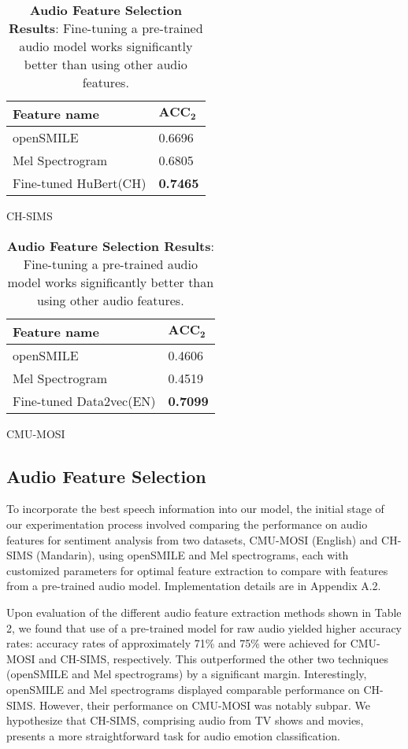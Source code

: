 \documentclass[11pt]{article}
\begin{document}
\begin{table}
\begin{subtable}{0.15\textwidth}
\begin{tabular}{ll}
\hline
\textbf{Feature name} & $\mathbf{ACC_2}$ \\ \hline
openSMILE             & 0.6696               \\ 
Mel Spectrogram       & 0.6805               \\ 
Fine-tuned HuBert(CH) & \textbf{0.7465}       \\ \hline
\end{tabular}
\caption{CH-SIMS}
\label{tab:dataset2}
\end{subtable}

\vspace{0.3cm}

\begin{subtable}{0.15\textwidth}
\begin{tabular}{ll}
\hline
\textbf{Feature name} & $\mathbf{ACC_2}$ \\ \hline
openSMILE             & 0.4606               \\ 
Mel Spectrogram       & 0.4519               \\ 
Fine-tuned Data2vec(EN) & \textbf{0.7099}     \\ \hline
\end{tabular}
\caption{CMU-MOSI}
\label{tab:dataset1}
\end{subtable}
\caption{\textbf{Audio Feature Selection Results}: Fine-tuning a pre-trained audio model works significantly better than using other audio features.}
\label{tab:Performance2}
\end{table}

\subsection{Audio Feature Selection}
To incorporate the best speech information into our model, the initial stage of our experimentation process involved comparing the performance on audio features for sentiment analysis from two datasets, CMU-MOSI (English) and CH-SIMS (Mandarin), using openSMILE and Mel spectrograms, each with customized parameters for optimal feature extraction to compare with features from a pre-trained audio model. Implementation details are in Appendix A.2.

Upon evaluation of the different audio feature extraction methods shown in Table 2, we found that use of a pre-trained model for raw audio yielded higher accuracy rates:  accuracy rates of approximately 71\% and 75\% were achieved for CMU-MOSI and CH-SIMS, respectively. This outperformed the other two techniques (openSMILE and Mel spectrograms) by a significant margin. Interestingly, openSMILE and Mel spectrograms displayed comparable performance on CH-SIMS. However, their performance on CMU-MOSI was notably subpar. We hypothesize that CH-SIMS, comprising audio from TV shows and movies, presents a more straightforward task for audio emotion classification.
\end{document}
